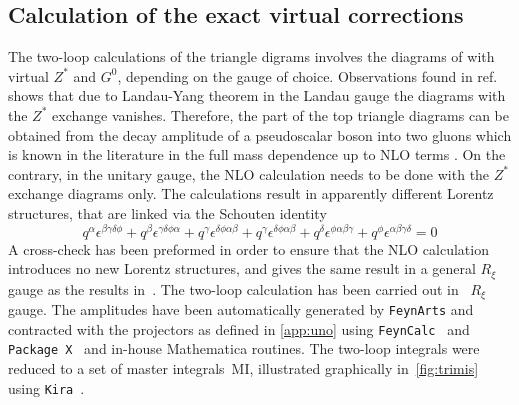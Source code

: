 \subsection{Calculation of the exact virtual corrections}
The two-loop calculations of the triangle digrams involves the diagrams of with virtual $Z^*$ and $G^0$, depending on the gauge of choice. Observations found in ref.\cite{Altenkamp:2012sx} shows that due to Landau-Yang theorem  in the Landau gauge the diagrams with the  $Z^*$ exchange vanishes. Therefore, the part of the top triangle diagrams  can be obtained from the decay amplitude of a pseudoscalar boson into two gluons which is  known in the literature in the full mass dependence up to NLO terms \cite{Spira:1995rr,Aglietti:2006tp}. On the contrary, in the unitary gauge, the NLO calculation needs to be done with the $Z^*$ exchange diagrams only.  The calculations result in apparently different Lorentz structures, that are linked via the Schouten identity 
\begin{equation}
q^\alpha \epsilon^{\beta \gamma \delta  \phi} + q^\beta \epsilon^{\gamma \delta  \phi \alpha}+ q^\gamma \epsilon^{ \delta  \phi \alpha \beta} +q^\gamma \epsilon^{ \delta  \phi \alpha \beta} + q^\delta \epsilon^{   \phi \alpha \beta \gamma } +  q^\phi \epsilon^{ \alpha \beta \gamma \delta } =0 
\end{equation}
A cross-check has been preformed in order to ensure that the NLO calculation introduces no new Lorentz structures, and gives the same result in a general $ R_\xi$ gauge as the results in~\cite{Spira:1995rr,Aglietti:2006tp}. The two-loop calculation has been carried out in~ $ R_\xi$ gauge. The amplitudes have been automatically generated by \texttt{FeynArts} \cite{Hahn:2000kx} and
contracted with the projectors as defined in \autoref{app:uno}
using \texttt{FeynCalc }\cite{Mertig:1990an,Shtabovenko:2016sxi} and \texttt{Package X}~\cite{Patel:2016fam} and in-house
Mathematica routines. The two-loop integrals were reduced to a set of master integrals~MI, illustrated graphically in~\autoref{fig:trimis} using \texttt{Kira}~\cite{Maierhofer:2017gsa}.

